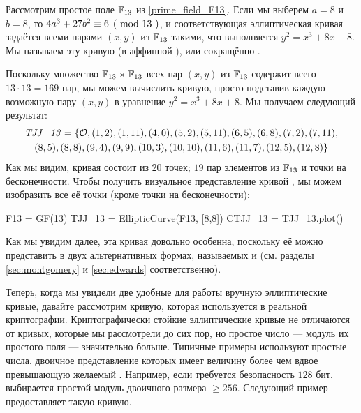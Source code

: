 \begin{example}\label{TJJ13} Рассмотрим простое поле $\mathbb{F}_{13}$ из \exercisename{} \ref{prime_field_F13}. Если мы выберем $a=8$ и $b=8$, то $\kongru{4a^3+ 27b^2}{6}{13}$, и соответствующая эллиптическая кривая задаётся всеми парами $(x,y)$ из $\mathbb{F}_{13}$ такими, что выполняется $y^2=x^3+8x+8$. Мы называем эту кривую  (в аффинной ), или сокращённо \TJJ{}.

Поскольку множество $\mathbb{F}_{13}\times \mathbb{F}_{13}$ всех пар $(x,y)$ из $\mathbb{F}_{13}$ содержит всего $13\cdot 13=169$ пар, мы можем вычислить кривую, просто подставив каждую возможную пару $(x,y)$ в уравнение  $y^2 = x^3 +8x +8$. Мы получаем следующий результат:
\begin{multline}\label{eq:TJJ13-weierstrass}
\mathit{TJJ\_13} = \{\mathcal{O}, (1, 2), (1, 11), (4, 0), (5, 2), (5, 11), (6, 5), (6, 8), (7,2), (7, 11), \\ (8, 5), (8, 8), (9, 4), (9, 9), (10, 3), (10,10), (11, 6), (11, 7), (12, 5), (12, 8)\}
\end{multline}
Как мы видим, кривая состоит из $20$ точек; $19$ пар элементов из $\mathbb{F}_{13}$ и точки на бесконечности. Чтобы получить визуальное представление кривой \TJJ{}, мы можем изобразить все её точки (кроме точки на бесконечности): 
\begin{sagesilent}
F13 = GF(13)
TJJ_13 = EllipticCurve(F13, [8,8])
CTJJ_13 = TJJ_13.plot()
\end{sagesilent}
\begin{center} 
\end{center}
Как мы увидим далее, эта кривая довольно особенна, поскольку её можно представить в двух альтернативных формах, называемых  и  (см. разделы \ref{sec:montgomery} и \ref{sec:edwards} соответственно).
\end{example}
Теперь, когда мы увидели две удобные для работы вручную эллиптические кривые, давайте рассмотрим кривую, которая используется в реальной криптографии. Криптографически стойкие эллиптические кривые  не отличаются от кривых, которые мы рассмотрели до сих пор, но простое число — модуль их простого поля — значительно больше. Типичные примеры используют простые числа, двоичное представление которых имеет величину более чем вдвое превышающую желаемый . Например, если требуется безопасность $128$ бит, выбирается простой модуль двоичного размера $\geq 256$. Следующий пример предоставляет такую кривую. 

